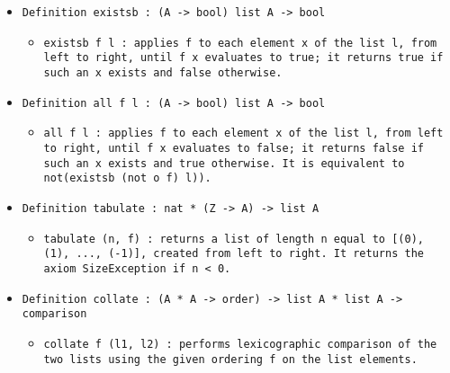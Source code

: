 \documentclass[11pt]{report}
\begin{document}
\begin{itemize}
\item  \texttt{Definition existsb : (A -> bool) list A -> bool}

\begin{itemize}
\item  \begin{flushleft} \texttt{existsb f l : applies f to each element x of the list l, from left to right, until f x evaluates to true; it returns true if such an x exists and false otherwise.} \end{flushleft}
\end{itemize}

\item  \texttt{Definition all f l : (A -> bool) list A -> bool}

\begin{itemize}
\item  \begin{flushleft} \texttt{all f l : applies f to each element x of the list l, from left to right, until f x evaluates to false; it returns false if such an x exists and true otherwise. It is equivalent to not(existsb (not o f) l)). } \end{flushleft}
\end{itemize}

\item  \texttt{Definition tabulate : nat * (Z -> A) -> list A}

\begin{itemize}
\item \begin{flushleft} \texttt{tabulate (n, f) : returns a list of length n equal to [(0), (1), ..., (-1)], created from left to right. It returns the axiom SizeException if n < 0.} \end{flushleft}
\end{itemize}

\item  \texttt{Definition collate : (A * A -> order) -> list A * list A -> comparison}

\begin{itemize}
\item  \begin{flushleft} \texttt{collate f (l1, l2) :  performs lexicographic comparison of the two lists using the given ordering f on the list elements. } \end{flushleft}

\end{itemize}

\end{itemize}
\end{document}
